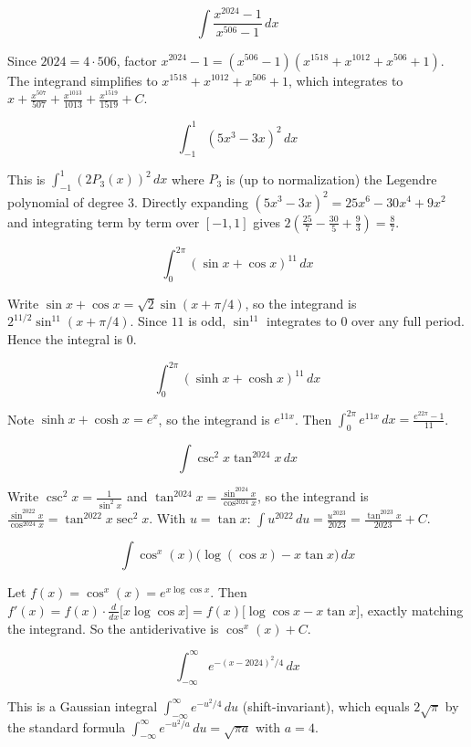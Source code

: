 \begin{questions}
\question
\[\int \frac{x^{2024}-1}{x^{506}-1}\,dx\]
\begin{solution}
Since $2024=4\cdot506$, factor $x^{2024}-1=(x^{506}-1)(x^{1518}+x^{1012}+x^{506}+1)$. The integrand simplifies to $x^{1518}+x^{1012}+x^{506}+1$, which integrates to $x+\frac{x^{507}}{507}+\frac{x^{1013}}{1013}+\frac{x^{1519}}{1519}+C$.
\end{solution}

\question
\[\int_{-1}^1 (5x^3-3x)^2\,dx\]
\begin{solution}
This is $\int_{-1}^1 (2P_3(x))^2\,dx$ where $P_3$ is (up to normalization) the Legendre polynomial of degree 3. Directly expanding $(5x^3-3x)^2=25x^6-30x^4+9x^2$ and integrating term by term over $[-1,1]$ gives $2\left(\frac{25}7-\frac{30}5+\frac93\right)=\frac87$.
\end{solution}

\question
\[\int_0^{2\pi} (\sin x+\cos x)^{11}\,dx\]
\begin{solution}
Write $\sin x+\cos x=\sqrt2\sin(x+\pi/4)$, so the integrand is $2^{11/2}\sin^{11}(x+\pi/4)$. Since $11$ is odd, $\sin^{11}$ integrates to $0$ over any full period. Hence the integral is $0$.
\end{solution}

\question
\[\int_0^{2\pi} (\sinh x+\cosh x)^{11}\,dx\]
\begin{solution}
Note $\sinh x+\cosh x = e^x$, so the integrand is $e^{11x}$. Then $\int_0^{2\pi}e^{11x}\,dx = \frac{e^{22\pi}-1}{11}$.
\end{solution}

\question
\[\int \csc^2x\tan^{2024}x\,dx\]
\begin{solution}
Write $\csc^2x = \frac{1}{\sin^2x}$ and $\tan^{2024}x=\frac{\sin^{2024}x}{\cos^{2024}x}$, so the integrand is $\frac{\sin^{2022}x}{\cos^{2024}x} = \tan^{2022}x\sec^2x$. With $u=\tan x$: $\int u^{2022}\,du = \frac{u^{2023}}{2023} = \frac{\tan^{2023}x}{2023}+C$.
\end{solution}

\question
\[\int \cos^x(x)\big(\log(\cos x)-x\tan x\big)\,dx\]
\begin{solution}
Let $f(x)=\cos^x(x)=e^{x\log\cos x}$. Then $f'(x) = f(x)\cdot\frac{d}{dx}\big[x\log\cos x\big] = f(x)\big[\log\cos x - x\tan x\big]$, exactly matching the integrand. So the antiderivative is $\cos^x(x)+C$.
\end{solution}

\question
\[\int_{-\infty}^{\infty} e^{-(x-2024)^2/4}\,dx\]
\begin{solution}
This is a Gaussian integral $\int_{-\infty}^\infty e^{-u^2/4}\,du$ (shift-invariant), which equals $2\sqrt\pi$ by the standard formula $\int_{-\infty}^\infty e^{-u^2/a}\,du = \sqrt{\pi a}$ with $a=4$.
\end{solution}


\end{questions}
